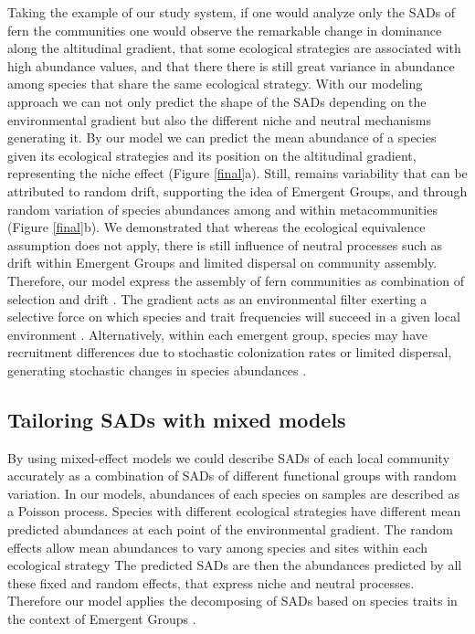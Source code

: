 \documentclass[12pt]{article}
\begin{document}
Taking the example of our study system, if one would analyze only the SADs of fern the communities one would observe the remarkable change in dominance along the altitudinal gradient, that some ecological strategies are associated with high abundance values, and that there there is still great variance in abundance among species that
share the same ecological strategy.  
With our modeling approach we can not only predict the shape of the SADs depending on the environmental gradient but also the different niche and neutral mechanisms generating it. By our model we can predict the mean abundance of a species given its ecological strategies and its position on the altitudinal gradient, representing the niche effect (Figure \ref{final}a).
Still, remains variability that can be attributed to random drift, supporting the idea of Emergent Groups, and through random variation of species abundances among and within metacommunities (Figure \ref{final}b).   
We demonstrated that whereas the
ecological equivalence assumption does not apply, there is still
influence of neutral processes such as drift within Emergent Groups
and limited dispersal on community assembly.
Therefore, our model express the assembly of fern communities as combination of 
selection and drift \citep{Vellend2010}. The gradient acts as an environmental
filter exerting a selective force on which species and trait frequencies will succeed
in a given local environment \citep{Webb2010}. 
Alternatively, within each emergent group,
species may have recruitment differences due to stochastic colonization
rates or limited dispersal, generating stochastic changes in species
abundances \citep{Gravel2006, Weiher2011}.


\subsection*{Tailoring SADs with mixed models} 

By using mixed-effect models we could describe SADs of each local
community accurately as a combination
of SADs of different functional groups with random variation.
In our models, abundances of each species on samples are described as a
Poisson process. Species with different ecological strategies have
different mean predicted abundances at each point of the environmental
gradient. The random effects allow
mean abundances to vary among species and sites within each ecological
strategy %
The predicted SADs are then the
abundances predicted 
by all these fixed and random effects, that express niche and neutral
processes. %
Therefore our model applies the  
decomposing of SADs based on species traits \citep{Magurran2003} in
the context of Emergent Groups \citep{Herault2007}.
\end{document}
